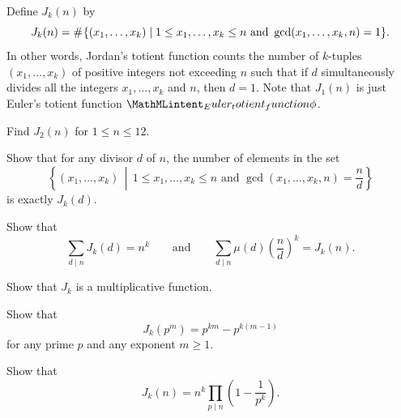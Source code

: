 \begin{challenge}
  \exercise Define  $J_k(n)$ by
  \begin{equation*}
    J_k(n) = \mathord{\#}\mkern1mu \{(x_1,\ldots,x_k)\mid 1\leq x_1,\ldots,x_k\leq n\text{ and }\gcd(x_1,\ldots,x_k,n)=1\}.
  \end{equation*}
  In other words, Jordan's totient function counts the number of $k$-tuples $(x_1,\ldots,x_k)$ of positive integers not exceeding $n$ such that if $d$ simultaneously divides all the integers $x_1,\ldots,x_k$ and $n$, then $d=1$. Note that $J_1(n)$ is just Euler's totient function $\totient$.
  \begin{subexenum}
  \item Find $J_2(n)$ for $1\leq n\leq 12$.
  \item Show that for any divisor $d$ of $n$, the number of elements in the set
    \begin{equation*}
      \left\{(x_1,\ldots,x_k) \,\middle|\, 1\leq x_1,\ldots,x_k\leq n\text{ and }\gcd(x_1,\ldots,x_k,n)=\frac{n}{d}\right\}
    \end{equation*}
    is exactly $J_k(d)$.
  \item Show that
    \begin{equation*}
      \sum_{d\mid n}J_k(d) = n^k\qquad\text{and}\qquad \sum_{d\mid n}\mu(d)\left(\frac{n}{d}\right)^k = J_k(n).
    \end{equation*}
  \item Show that $J_k$ is a multiplicative function.
  \item Show that
    \begin{equation*}
      J_k(p^m) = p^{km}-p^{k(m-1)}
    \end{equation*}
    for any prime $p$ and any exponent $m\geq 1$.
  \item Show that
    \begin{equation*}
      J_k(n) = n^k\prod_{p\mid n}\left(1-\frac{1}{p^k}\right).
    \end{equation*}
  \end{subexenum}
\end{challenge}


